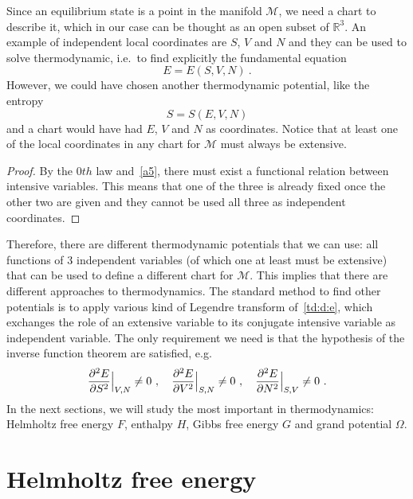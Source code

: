     Since an equilibrium state is a point in the manifold $\mathcal M$, we need a chart to describe it, which in our case can be thought as an open subset of $\mathbb R^3$. An example of independent local coordinates are $S$, $V$ and $N$ and they can be used to solve thermodynamic, i.e.~to find explicitly the fundamental equation 
    \begin{equation}\label{td:coord:e}
        E = E(S, V, N) ~.
    \end{equation}
    However, we could have chosen another thermodynamic potential, like the entropy
    \begin{equation}\label{td:coord:s}
        S = S(E, V, N) 
    \end{equation}
    and a chart would have had $E$, $V$ and $N$ as coordinates. Notice that at least one of the local coordinates in any chart for $\mathcal M$ must always be extensive. 
    \begin{proof}
        By the $0th$ law and~\eqref{a5}, there must exist a functional relation between intensive variables. This means that one of the three is already fixed once the other two are given and they cannot be used all three as independent coordinates.
    \end{proof}
    Therefore, there are different thermodynamic potentials that we can use: all functions of $3$ independent variables (of which one at least must be extensive) that can be used to define a different chart for $\mathcal M$. This implies that there are different approaches to thermodynamics. The standard method to find other potentials is to apply various kind of Legendre transform of~\eqref{td:d:e}, which exchanges the role of an extensive variable to its conjugate intensive variable as independent variable. The only requirement we need is that the hypothesis of the inverse function theorem are satisfied, e.g. 
    \begin{equation*}
        \frac{\partial^2 E}{\partial S^2} \Big \vert_{V,N} \neq 0 ~, \quad \frac{\partial^2 E}{\partial V^2} \Big \vert_{S,N} \neq 0 ~, \quad \frac{\partial^2 E}{\partial N^2} \Big \vert_{S, V} \neq 0 ~.
    \end{equation*}
    In the next sections, we will study the most important in thermodynamics: Helmholtz free energy $F$, enthalpy $H$, Gibbs free energy $G$ and grand potential $\Omega$.

\section{Helmholtz free energy} 

